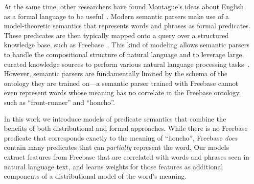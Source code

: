 \documentclass[11pt]{article}
\begin{document}
At the same time, other researchers have found Montague's ideas about English
as a formal language to be useful~\cite{montague-1974-english-formal-language}.
Modern semantic parsers make use of a model-theoretic semantics that represents
words and phrases as formal predicates.  These predicates are then typically
mapped onto a query over a structured knowledge base, such as
Freebase~\cite{freebase-2008-bollacker}.  This kind of modeling allows semantic
parsers to handle the compositional structure of natural language and to
leverage large, curated knowledge sources to perform various natural language
processing
tasks~\cite{zettlemoyer-2005-ccg,kwiatkowski-2013-ontology-matching,berant-2013-semantic-parsing-qa}.
However, semantic parsers are fundamentally limited by the schema of the
ontology they are trained on---a semantic parser trained with Freebase cannot
even represent words whose meaning has no correlate in the Freebase ontology,
such as ``front-runner'' and ``honcho''.

In this work we introduce models of predicate semantics that combine the
benefits of both distributional and formal approaches.  While there is no
Freebase predicate that corresponds exactly to the meaning of ``honcho'',
Freebase \emph{does} contain many predicates that can \emph{partially}
represent the word.  Our models extract features from Freebase that are
correlated with words and phrases seen in natural language text, and learns
weights for those features as additional components of a distributional model
of the word's meaning.
\end{document}
